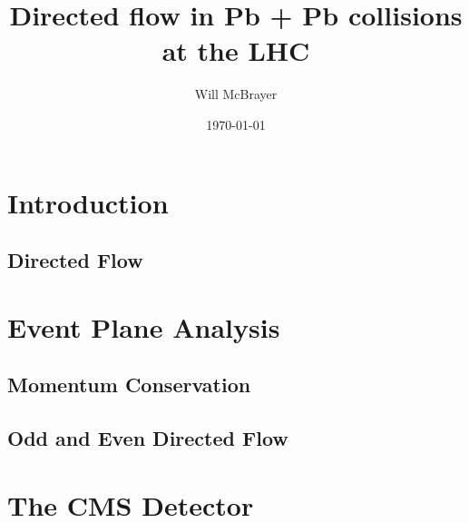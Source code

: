 \documentclass[%
 reprint, %
 amsmath,amssymb,
 aps,
 prc
]{revtex4-1}
\begin{document}
\title{Directed flow in Pb + Pb collisions at the LHC}
\author{Will McBrayer}
\date{\today}


\begin{abstract}

\end{abstract}


\maketitle


\section{Introduction}
\label{sec:Introduction}


\subsection{Directed Flow}
\label{subsec:Directed_Flow}



\section{Event Plane Analysis}
\label{subsec:Event_Plane_Analysis}


\subsection{Momentum Conservation}
\label{subsec:Momentum_Conservation}


\subsection{Odd and Even Directed Flow}
\label{subsec:odd_vs_even}



\section{The CMS Detector}
\label{sec:CMS_detector}

\end{document}
